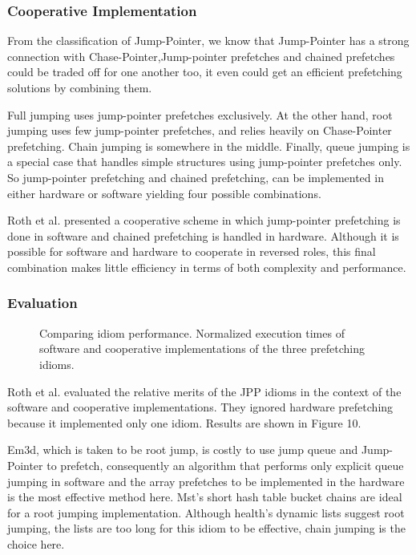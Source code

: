 \documentclass{acm_proc_article-sp}
\begin{document}
\subsubsection{Cooperative Implementation}
From the classification of Jump-Pointer, we know that Jump-Pointer has
a strong connection with Chase-Pointer,Jump-pointer prefetches and
chained prefetches could be traded off for one another too, it even
could get an efficient prefetching solutions by combining them.  

Full jumping uses jump-pointer prefetches exclusively. At the other
hand,  root jumping uses few jump-pointer prefetches, and relies
heavily on Chase-Pointer prefetching. Chain jumping is somewhere in
the middle. Finally, queue jumping is a special 
case that handles simple structures using jump-pointer
prefetches only. So jump-pointer prefetching
and chained prefetching, can be implemented in either
hardware or software yielding four possible combinations.

Roth et al. presented a cooperative scheme in which jump-pointer
prefetching is done in software and chained prefetching is handled in
hardware. Although it is possible for software and hardware to
cooperate in reversed roles, this final combination 
makes little efficiency in terms of both complexity and performance.

\subsubsection{Evaluation}

\begin{figure}
\centering
{}
\caption{Comparing idiom performance. Normalized
execution times of software and cooperative
implementations of the three prefetching
idioms.\cite{Roth:1999:EJP:307338.300989}} 
\end{figure}

Roth et al. evaluated the relative merits of the JPP idioms in the
context of the software and cooperative implementations.
They ignored hardware prefetching  because it implemented only one
idiom. Results are shown in Figure 10. 

Em3d, which is taken to be root jump, is costly to use jump queue and
Jump-Pointer to prefetch, consequently  an
algorithm that performs only explicit queue 
jumping in software and the array prefetches to be implemented in the
hardware is the most effective method here. 
Mst’s short hash table bucket chains are ideal for a root
jumping implementation. 
Although health’s dynamic lists
suggest root jumping, the lists are too long for this idiom
to be effective, chain jumping is the choice here.
\end{document}
